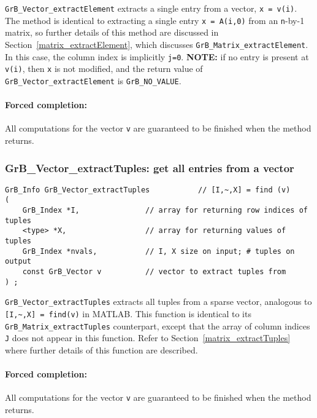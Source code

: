 \documentclass[12pt]{article}
\begin{document}
\verb'GrB_Vector_extractElement' extracts a single entry from a vector,
\verb'x = v(i)'.  The method is identical to extracting a single entry
\verb'x = A(i,0)' from an \verb'n'-by-1 matrix, so further details of this
method are discussed in Section~\ref{matrix_extractElement}, which discusses
\verb'GrB_Matrix_extractElement'.  In this case, the column index is implicitly
\verb'j=0'.
{\bf NOTE: }  if no entry is present at \verb'v(i)', then
\verb'x' is not modified, and the return value of
\verb'GrB_Vector_extractElement' is \verb'GrB_NO_VALUE'.

\paragraph{Forced completion:}
All computations for the vector \verb'v' are
guaranteed to be finished when the method returns.

\subsubsection{{\sf GrB\_Vector\_extractTuples:} get all entries from a vector}
\label{vector_extractTuples}

\begin{mdframed}[userdefinedwidth=6in]
{\footnotesize
\begin{verbatim}
GrB_Info GrB_Vector_extractTuples           // [I,~,X] = find (v)
(
    GrB_Index *I,               // array for returning row indices of tuples
    <type> *X,                  // array for returning values of tuples
    GrB_Index *nvals,           // I, X size on input; # tuples on output
    const GrB_Vector v          // vector to extract tuples from
) ;
\end{verbatim} } \end{mdframed}

\verb'GrB_Vector_extractTuples' extracts all tuples from a sparse vector,
analogous to \verb'[I,~,X] = find(v)' in MATLAB.  This function is identical to
its \verb'GrB_Matrix_extractTuples' counterpart, except that the array of
column indices \verb'J' does not appear in this function.  Refer to
Section~\ref{matrix_extractTuples} where further details of this function are
described.

\paragraph{Forced completion:}
All computations for the vector \verb'v' are
guaranteed to be finished when the method returns.
\end{document}
